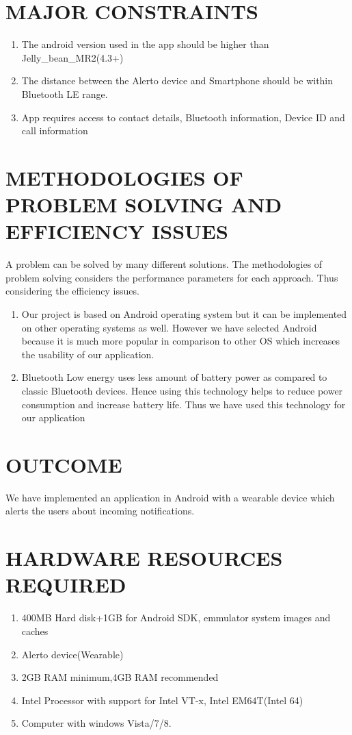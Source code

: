 \documentclass[12pt,a4paper]{report}
\begin{document}
\section{MAJOR CONSTRAINTS}
\begin{enumerate}
	\item	The android version used in the app should be higher than Jelly\_bean\_MR2(4.3+)
	\item	The distance between the Alerto device and Smartphone should be within Bluetooth LE range.
	\item	App requires access to contact details, Bluetooth information, Device ID and call information
\end{enumerate}


\section{METHODOLOGIES OF PROBLEM SOLVING AND EFFICIENCY ISSUES}
A problem can be solved by many different solutions. The methodologies of problem solving considers the performance parameters for each approach. Thus considering the efficiency issues.
\begin{enumerate}
	\item Our project is based on Android operating system  but it can be implemented on other operating systems as well. However we have selected Android because it is much more popular in comparison to other OS which increases the usability of our application.
	\item Bluetooth Low energy uses less amount of battery power as compared to classic Bluetooth devices. Hence using this technology helps to reduce power consumption and increase  battery life. Thus we have used this technology for our application
\end{enumerate}

\section{OUTCOME}
We have implemented an application in Android with a wearable device which alerts the users about incoming notifications.

\section{HARDWARE RESOURCES REQUIRED}
\begin{enumerate}
	\item	400MB Hard disk+1GB for Android SDK, emmulator system images and caches
	\item	Alerto device(Wearable)
	\item	2GB RAM minimum,4GB RAM recommended
	\item	Intel Processor with support for Intel VT-x, Intel EM64T(Intel 64)
	\item	Computer  with windows Vista/7/8.
	
\end{enumerate}
\end{document}
